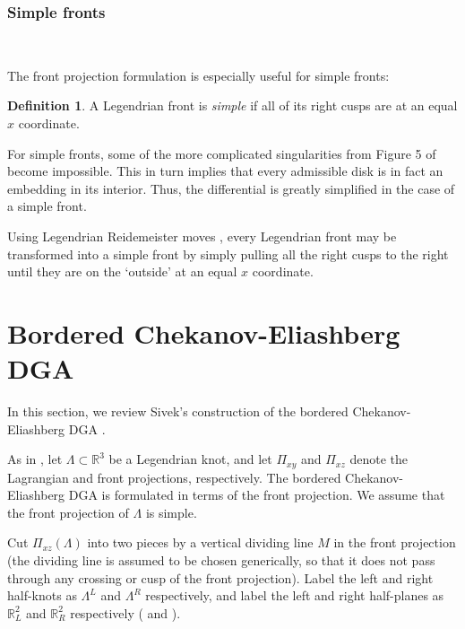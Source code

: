 \documentclass[a4paper,final, reqno]{amsart}
\theoremstyle{plain}
\theoremstyle{definition}
\newtheorem{Def}[Th]{Definition}
\begin{document}
	\subsubsection{Simple fronts} \label{subsec:simple} \-\
	
	The front projection formulation is especially useful for simple fronts:
	
	\begin{Def}
		A Legendrian front is \emph{simple} if all of its right cusps are at an equal $x$ coordinate.
	\end{Def}
	
	
	For simple fronts, some of the more complicated singularities from Figure 5 of \cite{ngres} become impossible. This in turn implies that every admissible disk is in fact an embedding in its interior.	Thus, the differential is greatly simplified in the case of a simple front.
	
	
	
	Using Legendrian Reidemeister moves \cite{reidemeister}, every Legendrian front may be transformed into a simple front by simply pulling all the right cusps to the right until they are on the `outside' at an equal $x$ coordinate. %
	
	
	
	\section{Bordered Chekanov-Eliashberg DGA}\label{sec:sivek}
	
	In this section, we review Sivek's construction of the bordered Chekanov-Eliashberg DGA \cite{sivek}.
	
	
	
	As in , let $\Lambda \subset \mathbb{R}^3$ be a Legendrian knot, and let $\Pi_{xy}$ and $\Pi_{xz}$ denote the Lagrangian and front projections, respectively. The bordered Chekanov-Eliashberg DGA is formulated in terms of the front projection. We assume that the front projection of $\Lambda$ is simple. 
	
	Cut $\Pi_{xz}(\Lambda)$ into two pieces by a vertical dividing line $M$ in the front projection (the dividing line is assumed to be chosen generically, so that it does not pass through any crossing or cusp of the front projection). Label the left and right half-knots as $\Lambda^L$ and $\Lambda^R$ respectively, and label the left and right half-planes as $\mathbb{R}^2_L$ and $\mathbb{R}^2_R$ respectively ( and ). 
	
\end{document}

